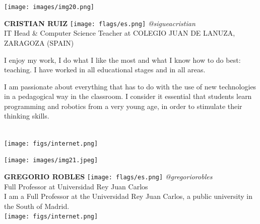\documentclass[11pt]{article}
\begin{document}
\noindent
\begin{minipage}{0.3\textwidth}
\centering
\texttt{[image: images/img20.png]}
\end{minipage}
\hfill
\begin{minipage}{0.6\textwidth}\raggedright
\color{color1}\uppercase{\textbf{CRISTIAN RUIZ}}
\color{color2}\hspace{0.2cm}\texttt{[image: flags/es.png]}
\hspace{0.2cm}\textit{@sigueacristian}
\\
IT Head \& Computer Science Teacher at COLEGIO JUAN DE LANUZA, ZARAGOZA (SPAIN)\\
{\footnotesize I enjoy my work, I do what I like the most and what I know how to do best: teaching. I have worked in all educational stages and in all areas.

I am passionate about everything that has to do with the use of new technologies in a pedagogical way in the classroom. I consider it essential that students learn programming and robotics from a very young age, in order to stimulate their thinking skills.}\\
\texttt{[image: figs/internet.png]}
\end{minipage}
\newline\newline\newline

\noindent
\begin{minipage}{0.3\textwidth}
\centering
\texttt{[image: images/img21.jpeg]}
\end{minipage}
\hfill
\begin{minipage}{0.6\textwidth}\raggedright
\color{color1}\uppercase{\textbf{Gregorio Robles}}
\color{color2}\hspace{0.2cm}\texttt{[image: flags/es.png]}
\hspace{0.2cm}\textit{@gregoriorobles}
\\
Full Professor at Universidad Rey Juan Carlos\\
{\footnotesize I am a Full Professor at the Universidad Rey Juan Carlos, a public university in the South of Madrid.}\\
\texttt{[image: figs/internet.png]}
\end{minipage}
\newline\newline\newline
\end{document}

